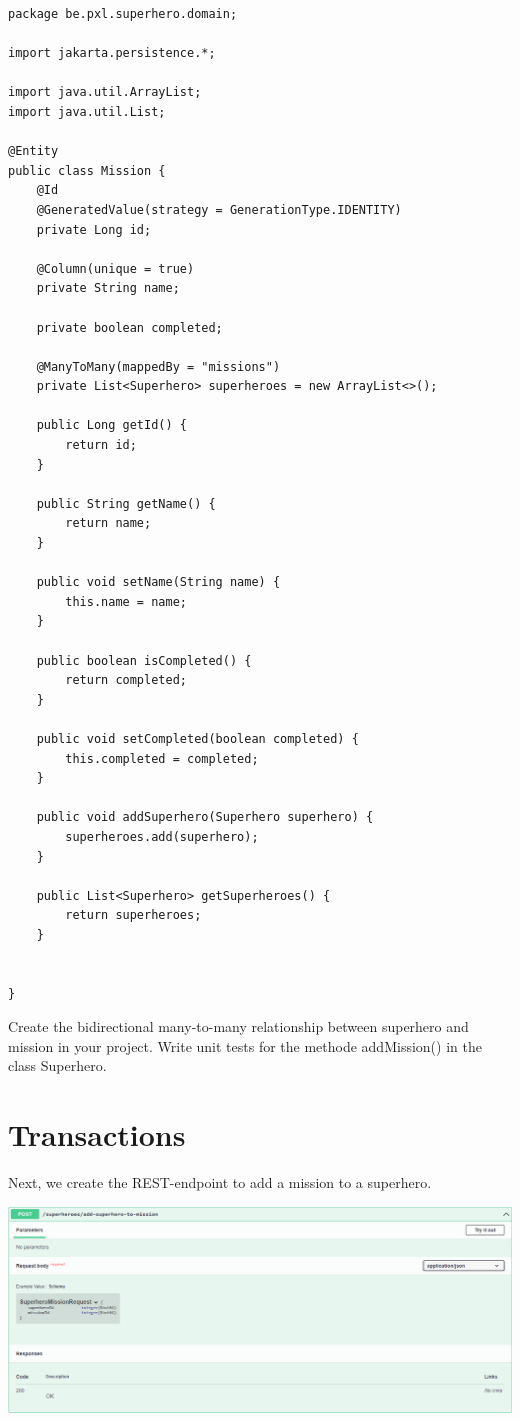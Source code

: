 \begin{lstlisting}
package be.pxl.superhero.domain;

import jakarta.persistence.*;

import java.util.ArrayList;
import java.util.List;

@Entity
public class Mission {
	@Id
	@GeneratedValue(strategy = GenerationType.IDENTITY)
	private Long id;

	@Column(unique = true)
	private String name;

	private boolean completed;

	@ManyToMany(mappedBy = "missions")
	private List<Superhero> superheroes = new ArrayList<>();

	public Long getId() {
		return id;
	}

	public String getName() {
		return name;
	}

	public void setName(String name) {
		this.name = name;
	}

	public boolean isCompleted() {
		return completed;
	}

	public void setCompleted(boolean completed) {
		this.completed = completed;
	}

	public void addSuperhero(Superhero superhero) {
		superheroes.add(superhero);
	}

	public List<Superhero> getSuperheroes() {
		return superheroes;
	}


}
\end{lstlisting}


\begin{oefening}
Create the bidirectional many-to-many relationship between superhero and mission in your project. 
Write unit tests for the methode addMission() in the class Superhero.
\end{oefening}

\section{Transactions}

Next, we create the REST-endpoint to add a mission to a superhero.

\includegraphics[width=\textwidth]{./images/chapter-jpa/superhero_controller_add_superhero_to_mission}

